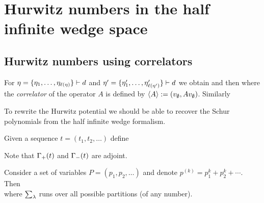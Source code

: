 \documentclass[10pt]{beamer}
\begin{document}
\section{Hurwitz numbers in the half infinite wedge space}

\subsection{Hurwitz numbers using correlators}

\begin{frame}

For $\eta=\{\eta_1,\ldots,\eta_{\ell(\eta)}\}\vdash d$ and $\eta'=\{\eta'_1,\ldots,\eta'_{\ell(\eta')}\}\vdash d$ we obtain
and then
where the \emph{correlator} of the operator $A$ is defined by $\langle A\rangle:=(v_\emptyset,Av_\emptyset)$. Similarly

\end{frame}

\begin{frame}

To rewrite the Hurwitz potential we should be able to recover the Schur polynomials from the half infinite wedge formalism. 

\begin{definition}
Given a sequence $t=(t_1,t_2,\ldots)$ define
\end{definition}

Note that $\Gamma_+(t)$ and $\Gamma_-(t)$ are adjoint. 
\begin{lemma}
	Consider a set of variables $P=(p_1,p_2,\ldots)$ and denote $p^{(k)}=p_1^k+p_2^k+\cdots$. Then\\[-15pt]
	where $\sum_\lambda$ runs over all possible partitions (of any number).
\end{lemma}

\end{frame}
\end{document}

